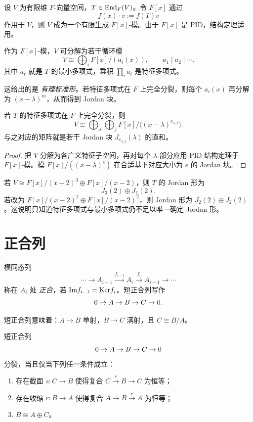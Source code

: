 设 $V$ 为有限维 $F$-向量空间，$T\in \mathrm{End}_F(V)$。令 $F[x]$ 通过
\[
 f(x)\cdot v:=f(T)v
\]
作用于 $V$，则 $V$ 成为一个有限生成 $F[x]$-模。由于 $F[x]$ 是 PID，结构定理适用。

\begin{proposition}
作为 $F[x]$-模，$V$ 可分解为若干循环模
\[
 V\cong \bigoplus_i F[x]/(a_i(x)),\qquad a_1\mid a_2\mid\cdots.
\]
其中 $a_r$ 就是 $T$ 的最小多项式，乘积 $\prod_i a_i$ 是特征多项式。
\end{proposition}

\begin{remark}
这给出的是 \emph{有理标准形}。若特征多项式在 $F$ 上完全分裂，则每个 $a_i(x)$ 再分解为 $(x-\lambda)^m$，从而得到 Jordan 块。
\end{remark}

\begin{theorem}
若 $T$ 的特征多项式在 $F$ 上完全分裂，则
\[
 V\cong \bigoplus_{\lambda}\bigoplus_j F[x]/\bigl((x-\lambda)^{e_{\lambda,j}}\bigr).
\]
与之对应的矩阵就是若干 Jordan 块 $J_{e_{\lambda,j}}(\lambda)$ 的直和。
\end{theorem}

\begin{proof}
把 $V$ 分解为各广义特征子空间，再对每个 $\lambda$-部分应用 PID 结构定理于 $F[x]$-模。模 $F[x]/((x-\lambda)^e)$ 在合适基下对应大小为 $e$ 的 Jordan 块。
\end{proof}

\begin{example}
若 $V\cong F[x]/(x-2)^3\oplus F[x]/(x-2)$，则 $T$ 的 Jordan 形为
\[
 J_3(2)\oplus J_1(2).
\]
若改为 $F[x]/(x-2)^2\oplus F[x]/(x-2)^2$，则 Jordan 形为 $J_2(2)\oplus J_2(2)$。这说明只知道特征多项式与最小多项式仍不足以唯一确定 Jordan 形。
\end{example}

\section{正合列}

\begin{definition}
模同态列
\[
 \cdots\to A_{i-1}\xrightarrow{f_{i-1}} A_i\xrightarrow{f_i} A_{i+1}\to\cdots
\]
称在 $A_i$ 处 \emph{正合}，若 $\mathrm{Im} f_{i-1}=\mathrm{Ker} f_i$。短正合列写作
\[
 0 \to A \to B \to C \to 0.
\]
\end{definition}

短正合列意味着：$A\to B$ 单射，$B\to C$ 满射，且 $C\cong B/A$。

\begin{proposition}
短正合列
\[
 0 \to A \to B \to C \to 0
\]
分裂，当且仅当下列任一条件成立：
\begin{enumerate}[label=(\roman*)]
\item 存在截面 $s:C\to B$ 使得复合 $C\xrightarrow{s}B\to C$ 为恒等；
\item 存在收缩 $r:B\to A$ 使得复合 $A\to B\xrightarrow{r}A$ 为恒等；
\item $B\cong A\oplus C$。
\end{enumerate}
\end{proposition}

